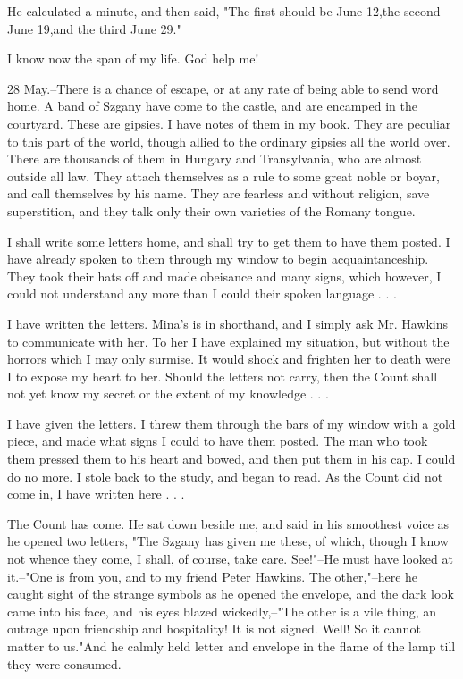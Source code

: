 He calculated a minute, and then said, "The first should be June 12,the second June 19,and the third June 29." 

I know now the span of my life. God help me! 

28 May.--There is a chance of escape, or at any rate of being able to send word home. A band of Szgany have come to the castle, and are encamped in the courtyard. These are gipsies. I have notes of them in my book. They are peculiar to this part of the world, though allied to the ordinary gipsies all the world over. There are thousands of them in Hungary and Transylvania, who are almost outside all law. They attach themselves as a rule to some great noble or boyar, and call themselves by his name. They are fearless and without religion, save superstition, and they talk only their own varieties of the Romany tongue. 

I shall write some letters home, and shall try to get them to have them posted. I have already spoken to them through my window to begin acquaintanceship. They took their hats off and made obeisance and many signs, which however, I could not understand any more than I could their spoken language . . . 

I have written the letters. Mina's is in shorthand, and I simply ask Mr. Hawkins to communicate with her. To her I have explained my situation, but without the horrors which I may only surmise. It would shock and frighten her to death were I to expose my heart to her. Should the letters not carry, then the Count shall not yet know my secret or the extent of my knowledge . . . 

I have given the letters. I threw them through the bars of my window with a gold piece, and made what signs I could to have them posted. The man who took them pressed them to his heart and bowed, and then put them in his cap. I could do no more. I stole back to the study, and began to read. As the Count did not come in, I have written here . . . 

The Count has come. He sat down beside me, and said in his smoothest voice as he opened two letters, "The Szgany has given me these, of which, though I know not whence they come, I shall, of course, take care. See!"--He must have looked at it.--"One is from you, and to my friend Peter Hawkins. The other,"--here he caught sight of the strange symbols as he opened the envelope, and the dark look came into his face, and his eyes blazed wickedly,--"The other is a vile thing, an outrage upon friendship and hospitality! It is not signed. Well! So it cannot matter to us."And he calmly held letter and envelope in the flame of the lamp till they were consumed. 

